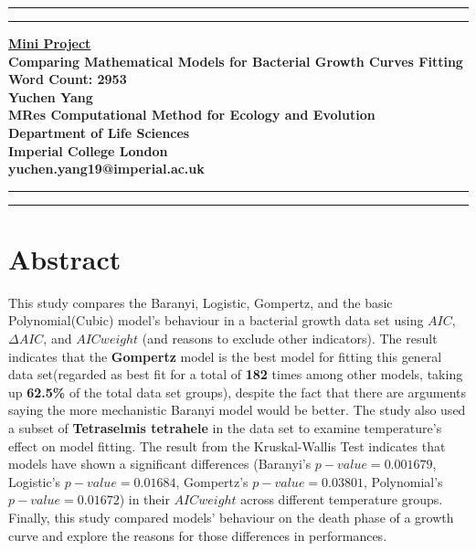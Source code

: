 \documentclass[11pt]{article}
\newcommand{\soptitle}{Comparing Mathematical Models for Bacterial Growth Curves Fitting}
\begin{document}
\begin{titlepage}
\begin{center}
\hrule
\vspace{2pt}
\hrule
\vspace{2cm}
\LARGE {\bf \underline{Mini Project}}\\
\vspace{2cm}
\huge{\bf \soptitle}\\
\large {\bf Word Count: 2953}\\
\vspace{8cm}
\LARGE {\bf Yuchen Yang}\\
\large {\bf MRes Computational Method for Ecology and Evolution}\\
\large {\bf Department of Life Sciences}\\
\large {\bf Imperial College London}\\
\large {\bf yuchen.yang19@imperial.ac.uk}
\vspace{2cm}
\end{center}
\hrule
\vspace{2pt}
\hrule
\end{titlepage}
\linenumbers
\section*{Abstract}
This study compares the Baranyi, Logistic, Gompertz, and the basic Polynomial(Cubic) model's behaviour in a bacterial growth data set using $AIC$, $\Delta AIC$, and $AIC weight$ (and reasons to exclude other indicators). The result indicates that the \textbf{Gompertz} model is the best model for fitting this general data set(regarded as best fit for a total of \textbf{182} times among other models, taking up \textbf{62.5\%} of the total data set groups), despite the fact that there are arguments saying the more mechanistic Baranyi model would be better. The study also used a subset of \textbf{Tetraselmis tetrahele} in the data set to examine temperature's effect on model fitting. The result from the Kruskal-Wallis Test indicates that models have shown a significant differences (Baranyi's $p-value = 0.001679$, Logistic's $p-value = 0.01684$, Gompertz's $p-value = 0.03801$, Polynomial's $p-value = 0.01672$) in their $AIC weight$ across different temperature groups. Finally, this study compared models' behaviour on the death phase of a growth curve and explore the reasons for those differences in performances.
\end{document}
